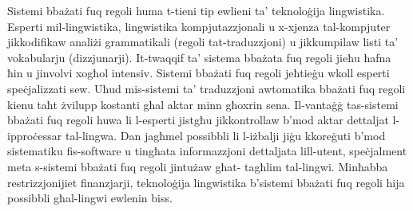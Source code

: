 \documentclass[]{../../metanetpaper}
\begin{document}
\begin{multicols}{2}
   
Sistemi bbażati fuq regoli huma t-tieni tip ewlieni ta’ teknoloġija lingwistika. Esperti mil-lingwistika, lingwistika kompjutazzjonali u x-xjenza tal-kompjuter jikkodifikaw analiżi grammatikali (regoli tat-traduzzjoni) u jikkumpilaw listi ta’ vokabularju (dizzjunarji). It-twaqqif ta’ sistema bbażata fuq regoli jieħu ħafna ħin u jinvolvi xogħol intensiv. Sistemi bbażati fuq regoli jeħtieġu wkoll esperti speċjalizzati sew. Uħud mis-sistemi ta’ traduzzjoni awtomatika bbażati fuq regoli kienu taħt żvilupp kostanti għal aktar minn għoxrin sena. Il-vantaġġ tas-sistemi bbażati fuq regoli huwa li l-esperti jistgħu jikkontrollaw b’mod aktar dettaljat l-ipproċessar tal-lingwa. Dan jagħmel possibbli li l-iżbalji jiġu kkoreġuti b’mod sistematiku fis-software u tingħata informazzjoni dettaljata lill-utent, speċjalment meta s-sistemi bbażati fuq regoli jintużaw għat- tagħlim tal-lingwi. Minħabba restrizzjonijiet finanzjarji, teknoloġija lingwistika b’sistemi bbażati fuq regoli hija possibbli għal-lingwi ewlenin biss.
\end{multicols}

\clearpage


\end{document}
